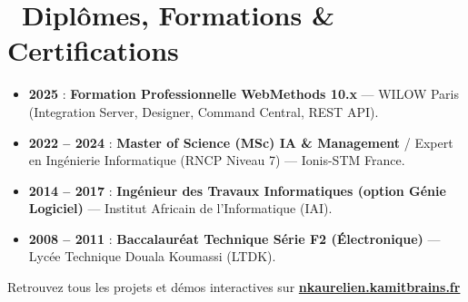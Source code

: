 \documentclass[10pt,a4paper]{article}
\begin{document}
\section{\faGraduationCap\ Diplômes, Formations \& Certifications}

\begin{itemize}[leftmargin=1.4em, itemsep=0.25em, topsep=0.2em]
    \item \textbf{2025} : \textbf{Formation Professionnelle WebMethods 10.x} --- WILOW Paris (Integration Server, Designer, Command Central, REST API).
    \item \textbf{2022 -- 2024} : \textbf{Master of Science (MSc) IA \& Management} / Expert en Ingénierie Informatique (RNCP Niveau 7) --- Ionis-STM France.
    \item \textbf{2014 -- 2017} : \textbf{Ingénieur des Travaux Informatiques (option Génie Logiciel)} --- Institut Africain de l'Informatique (IAI).
    \item \textbf{2008 -- 2011} : \textbf{Baccalauréat Technique Série F2 (Électronique)} --- Lycée Technique Douala Koumassi (LTDK).
\end{itemize}

\vspace{0.8em}
\begin{center}
    \footnotesize\color{slateGray}
    Retrouvez tous les projets et démos interactives sur \href{https://nkaurelien.kamitbrains.fr}{\textbf{nkaurelien.kamitbrains.fr}}
\end{center}
\end{document}
